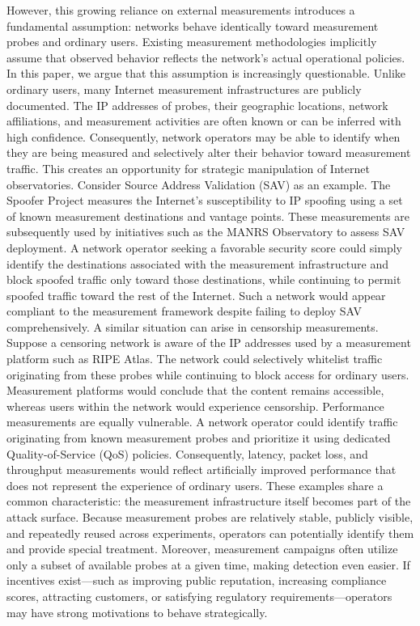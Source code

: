 \documentclass[sigconf, 10pt, anonymous, nonacm]{acmart}
\begin{document}
However, this growing reliance on external measurements introduces a fundamental assumption: networks behave identically toward measurement probes and ordinary users. Existing measurement methodologies implicitly assume that observed behavior reflects the network's actual operational policies. In this paper, we argue that this assumption is increasingly questionable.
Unlike ordinary users, many Internet measurement infrastructures are publicly documented. The IP addresses of probes, their geographic locations, network affiliations, and measurement activities are often known or can be inferred with high confidence. Consequently, network operators may be able to identify when they are being measured and selectively alter their behavior toward measurement traffic. This creates an opportunity for strategic manipulation of Internet observatories.
Consider Source Address Validation (SAV) as an example. The Spoofer Project measures the Internet's susceptibility to IP spoofing using a set of known measurement destinations and vantage points. These measurements are subsequently used by initiatives such as the MANRS Observatory to assess SAV deployment. A network operator seeking a favorable security score could simply identify the destinations associated with the measurement infrastructure and block spoofed traffic only toward those destinations, while continuing to permit spoofed traffic toward the rest of the Internet. Such a network would appear compliant to the measurement framework despite failing to deploy SAV comprehensively.
A similar situation can arise in censorship measurements. Suppose a censoring network is aware of the IP addresses used by a measurement platform such as RIPE Atlas. The network could selectively whitelist traffic originating from these probes while continuing to block access for ordinary users. Measurement platforms would conclude that the content remains accessible, whereas users within the network would experience censorship.
Performance measurements are equally vulnerable. A network operator could identify traffic originating from known measurement probes and prioritize it using dedicated Quality-of-Service (QoS) policies. Consequently, latency, packet loss, and throughput measurements would reflect artificially improved performance that does not represent the experience of ordinary users.
These examples share a common characteristic: the measurement infrastructure itself becomes part of the attack surface. Because measurement probes are relatively stable, publicly visible, and repeatedly reused across experiments, operators can potentially identify them and provide special treatment. Moreover, measurement campaigns often utilize only a subset of available probes at a given time, making detection even easier. If incentives exist—such as improving public reputation, increasing compliance scores, attracting customers, or satisfying regulatory requirements—operators may have strong motivations to behave strategically.
\end{document}
